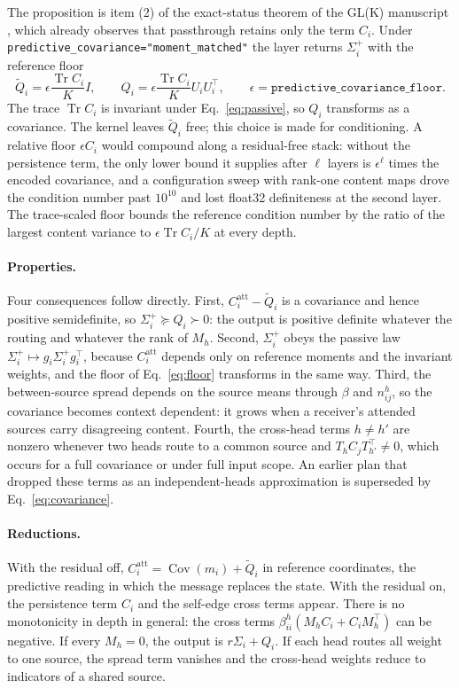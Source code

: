 \documentclass[11pt]{article}
\theoremstyle{definition}
\theoremstyle{remark}
\newcommand{\Tr}{\operatorname{Tr}}
\newcommand{\Cov}{\operatorname{Cov}}
\newcommand{\cfg}[1]{\texttt{#1}}
\begin{document}
The proposition is item (2) of the exact-status theorem of the GL(K) manuscript \citep{dennis2026glk}, which already observes that passthrough retains only the term $C_i$. Under \cfg{predictive\_covariance="moment\_matched"} the layer returns $\Sigma_i^{+}$ with the reference floor
\begin{equation}
\widetilde Q_i=\epsilon\frac{\Tr C_i}{K}I,\qquad Q_i=\epsilon\frac{\Tr C_i}{K}U_iU_i^{\top},\qquad \epsilon=\cfg{predictive\_covariance\_floor}.
\label{eq:floor}
\end{equation}
The trace $\Tr C_i$ is invariant under Eq.~\eqref{eq:passive}, so $Q_i$ transforms as a covariance. The kernel leaves $\widetilde Q_i$ free; this choice is made for conditioning. A relative floor $\epsilon C_i$ would compound along a residual-free stack: without the persistence term, the only lower bound it supplies after $\ell$ layers is $\epsilon^{\ell}$ times the encoded covariance, and a configuration sweep with rank-one content maps drove the condition number past $10^{10}$ and lost float32 definiteness at the second layer. The trace-scaled floor bounds the reference condition number by the ratio of the largest content variance to $\epsilon\Tr C_i/K$ at every depth.

\paragraph{Properties.}
Four consequences follow directly. First, $C_i^{\mathrm{att}}-\widetilde Q_i$ is a covariance and hence positive semidefinite, so $\Sigma_i^{+}\succeq Q_i\succ0$: the output is positive definite whatever the routing and whatever the rank of $M_h$. Second, $\Sigma_i^{+}$ obeys the passive law $\Sigma_i^{+}\mapsto g_i\Sigma_i^{+}g_i^{\top}$, because $C_i^{\mathrm{att}}$ depends only on reference moments and the invariant weights, and the floor of Eq.~\eqref{eq:floor} transforms in the same way. Third, the between-source spread depends on the source means through $\beta$ and $n_{ij}^{h}$, so the covariance becomes context dependent: it grows when a receiver's attended sources carry disagreeing content. Fourth, the cross-head terms $h\ne h'$ are nonzero whenever two heads route to a common source and $T_hC_jT_{h'}^{\top}\ne0$, which occurs for a full covariance or under full input scope. An earlier plan that dropped these terms as an independent-heads approximation is superseded by Eq.~\eqref{eq:covariance}.

\paragraph{Reductions.}
With the residual off, $C_i^{\mathrm{att}}=\Cov(m_i)+\widetilde Q_i$ in reference coordinates, the predictive reading in which the message replaces the state. With the residual on, the persistence term $C_i$ and the self-edge cross terms appear. There is no monotonicity in depth in general: the cross terms $\beta_{ii}^{h}(M_hC_i+C_iM_h^{\top})$ can be negative. If every $M_h=0$, the output is $r\Sigma_i+Q_i$. If each head routes all weight to one source, the spread term vanishes and the cross-head weights reduce to indicators of a shared source.
\end{document}
